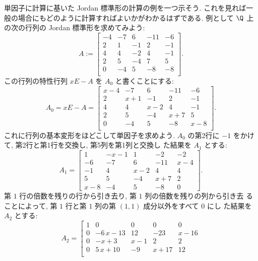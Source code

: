 \documentclass[12pt,twoside]{jarticle}
\begin{document}
\begin{example}
\label{example:ed-Jordan}
  単因子に計算に基いた Jordan 標準形の計算の例を一つ示そう.
  これを見れば一般の場合にもどのように計算すればよいかがわかるはずである.
  例として $\Q$ 上の次の行列の Jordan 標準形を求めてみよう:
  \[
  A := \left[ 
    \begin{array}{rrrrr}
      -4 & -7 &  6 & -11 & -6 \\
       2 &  1 & -1 &   2 & -1 \\
       4 &  4 & -2 &   4 & -1 \\
       2 &  5 & -4 &   7 &  5 \\
       0 & -4 &  5 &  -8 & -8 \\
    \end{array}
  \right].
  \]
  この行列の特性行列 $xE-A$ を $A_0$ と書くことにする:
  \[
  A_0 = x E - A = \left[ 
    \begin{array}{ccccc}
      {x} - 4 & -7 & 6 & -11 & -6 \\
      2 & {x} + 1 & -1 & 2 & -1 \\
      4 & 4 & {x} - 2 & 4 & -1 \\
      2 & 5 & -4 & {x} + 7 & 5 \\
      0 & -4 & 5 & -8 & {x} - 8 \\
    \end{array}
  \right].
  \]
  これに行列の基本変形をほどこして単因子を求めよう.
  $A_0$ の第2行に $-1$ をかけて, 第2行と第1行を交換し, 第5列を第1列と交換し
  た結果を $A_1$ とする:
  \[
  A_1 =  \left[ 
    \begin{array}{ccccc}
      1 &  - {x} - 1 & 1 & -2 & -2 \\
      -6 & -7 & 6 & -11 & {x} - 4 \\
      -1 & 4 & {x} - 2 & 4 & 4 \\
      5 & 5 & -4 & {x} + 7 & 2 \\
      {x} - 8 & -4 & 5 & -8 & 0
    \end{array}
  \right].
  \]
  第 $1$ 行の倍数を残りの行から引き去り, 第 $1$ 列の倍数を残りの列から引き去
  ることによって, 第 $1$ 行と第 $1$ 列の第 $(1,1)$ 成分以外をすべて $0$ にし
  た結果を $A_2$ とする:
  \[
  A_2 =  \left[ 
    \begin{array}{rcccc}
      1 & 0 & 0 & 0 & 0 \\
      0 &  - 6\,{x} - 13 & 12 & -23 & {x} - 16 \\
      0 &  - {x} + 3 & {x} - 1 & 2 & 2 \\
      0 & 5\,{x} + 10 & -9 & {x} + 17 & 12 \\

\end{array}\]
\end{example}
\end{document}
